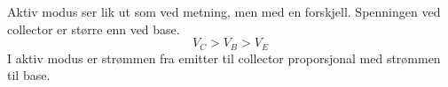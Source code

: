 Aktiv modus ser lik ut som ved metning, men med en forskjell.
Spenningen ved collector er større enn ved base.
$$V_C > V_B > V_E$$
I aktiv modus er strømmen fra emitter til collector
proporsjonal med strømmen til base.
